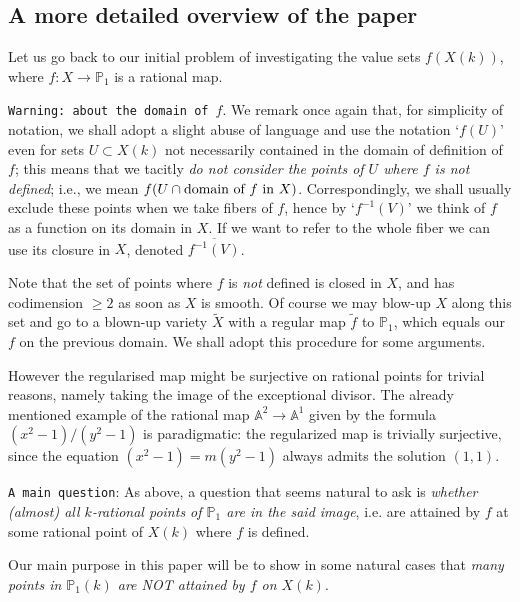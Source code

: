 \documentclass[leqno,12pt]{article} %
\def\A{{{\mathbb A}}}
\def\P{{{\mathbb P}}}
\theoremstyle{plain} %
\theoremstyle{definition} %
\begin{document}
 

\medskip

 

\subsection{ A more detailed overview of the paper} 

Let us go back to our initial problem of investigating the value sets $f(X(k))$, where $f:X \rightarrow \P_1$ is a rational map.

 
{\tt Warning: about the domain of $f$}. We remark   once again that,    for simplicity of notation, we shall adopt a slight  abuse of language  and   use  the notation `$f(U)$' even for sets $U\subset X(k)$ not necessarily contained in the domain of definition of $f$;  this means that  we tacitly {\it do not consider the points of $U$ where $f$ is not defined}; i.e., we mean $f(U\cap\hbox{domain of $f$ in $X$})$.  Correspondingly, we shall usually exclude these points when we take fibers of $f$, hence by `$f^{-1}(V)$' we think of $f$ as a function on its domain in $X$.  If we want to refer to the whole fiber we can use its closure in $X$, denoted $\overline{f^{-1}(V)}$. 

\medskip

Note that the set of points where $f$ is {\it not} defined is closed in $X$, and  has  codimension $\ge 2$ as soon as $X$ is smooth. Of course we may blow-up $X$ along this set and go to a blown-up variety $\tilde X$ with a regular map $\tilde f$ to $\P_1$, which equals our $f$ on the previous domain. We shall adopt this procedure for  some arguments. 

However the regularised map might be surjective on rational points for trivial reasons, namely taking the image of the exceptional divisor.   The already mentioned example of the rational map $\A^2\to \A^1$ given by the formula $(x^2-1)/(y^2-1)$ is paradigmatic: the regularized map is trivially surjective, since the equation $(x^2-1)=m(y^2-1)$ always admits the solution $(1,1)$.
\medskip

{\tt A main question}: As above, a question that seems natural to ask  is {\it whether (almost) all   $k$-rational points of $\P_1$ are in the said image},  i.e. are  attained by $f$ at some rational point of $X(k)$ where $f$ is defined. %


Our main purpose in this paper will be to show in some natural cases that {\it many  points in $\P_1(k)$ are NOT attained by $f$ on $X(k)$}.
\end{document}
